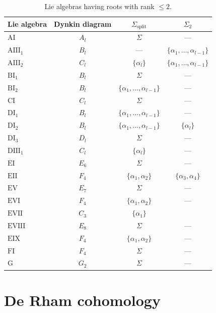 \documentclass[pdftex]{sigma}
\numberwithin{equation}{section}
\begin{document}
\begin{table}[h]\centering
\begin{tabular}{|l|c|c|c|}
\hline
Lie algebra & Dynkin diagram & $\Sigma_{\mathrm{split}}$ & $\Sigma_2 $ \\
\hline
$\mathrm{AI}$ & $A_l $ & $\Sigma $ & --- \\ \hline
$\mathrm{AIII_1}$ & $B_l $ & --- & $\{\alpha_{1}, \ldots, \alpha_{l-1} \} $
\\ \hline
$\mathrm{AIII_2}$ & $C_l $ & $\{\alpha_{l} \} $ & $\{\alpha_1, \ldots,
\alpha_{l-1}\}$ \\ \hline
$\mathrm{BI_1} $ & $B_l $ & $\Sigma $ & --- \\ \hline
$\mathrm{BI_2}$ & $B_l $ & $\{\alpha_1,\ldots,\alpha_{l-1}\}$ & --- \\ \hline
$\mathrm{CI}$ & $C_l $ & $\Sigma$ & --- \\ \hline
$\mathrm{DI_1}$ & $B_l $ & $\{\alpha_1, \dots, \alpha_{l-1}\}$ & --- \\ \hline
$\mathrm{DI_2}$ & $B_l $ & $\{\alpha_1, \ldots, \alpha_{l-1}\}$ & $%
\{\alpha_l\}$ \\ \hline
$\mathrm{DI_3}$ & $D_l $ & $\Sigma$ & --- \\ \hline
$\mathrm{DIII_1}$ & $C_l $ & $\{\alpha_l\}$ & --- \\ \hline
$\mathrm{EI}$ & $E_6 $ & $\Sigma$ & --- \\ \hline
$\mathrm{EII}$ & $F_4 $ & $\{\alpha_1,\alpha_2\}$ & $\{\alpha_3,\alpha_4\}$
\\ \hline
$\mathrm{EV}$ & $E_7 $ & $\Sigma$ & --- \\ \hline
$\mathrm{EVI}$ & $F_4 $ & $\{\alpha_1,\alpha_2\}$ & --- \\ \hline
$\mathrm{EVII}$ & $C_3 $ & $\{\alpha_1\}$ & \\ \hline
$\mathrm{EVIII}$ & $E_8 $ & $\Sigma$ & --- \\ \hline
$\mathrm{EIX}$ & $F_4 $ & $\{\alpha_1,\alpha_2\}$ & --- \\ \hline
$\mathrm{FI}$ & $F_4 $ & $\Sigma$ & --- \\ \hline
$\mathrm{G}$ & $G_2 $ & $\Sigma$ & --- \\ \hline
\end{tabular}
\caption{Lie algebras having roots with rank $\leq 2 $.}\label{table}
\end{table}

\section{De Rham cohomology}
\end{document}
